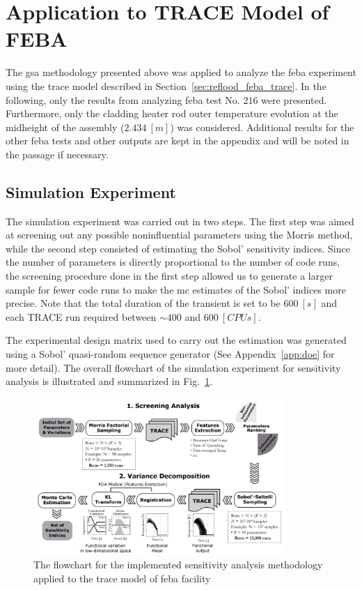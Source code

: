 \section{Application to TRACE Model of FEBA}\label{sec:sa_application_to_feba}

The \gls{gsa} methodology presented above was applied to analyze the \gls{feba} experiment using the \gls{trace} model described in Section~\ref{sec:reflood_feba_trace}.
In the following, only the results from analyzing \gls{feba} test No. $216$ were presented. 
Furthermore, only the cladding heater rod outer temperature evolution at the midheight of the assembly ($2.434 \ [m]$) was considered.
Additional results for the other \gls{feba} tests and other outputs are kept in the appendix and will be noted in the passage if necessary.

\subsection{Simulation Experiment}

The simulation experiment was carried out in two steps.
The first step was aimed at screening out any possible noninfluential parameters using the Morris method, 
while the second step consisted of estimating the Sobol' sensitivity indices.
Since the number of parameters is directly proportional to the number of code runs, 
the screening procedure done in the first step allowed us to generate a larger sample for fewer code runs to make the \gls{mc} estimates of the Sobol' indices more precise.
Note that the total duration of the transient is set to be $600 \ [s]$ and each TRACE run required between $\sim 400$ and $600 \ [CPUs]$.

The experimental design matrix used to carry out the estimation was generated using a Sobol' quasi-random sequence generator \cite{Joe2008} (See Appendix~\ref{app:doe} for more detail).
The overall flowchart of the simulation experiment for sensitivity analysis is illustrated and summarized in Fig.~\ref{fig:sensitivity_flowchart}.

\begin{figure}
	\centering
	\includegraphics[width=0.85\textwidth]{../figures/sensitivityFlowchart/sensitivityFlowchart.png}
	\caption[The flowchart for the implemented sensitivity analysis methodology applied to the TRACE model of FEBA facility]{The flowchart for the implemented sensitivity analysis methodology applied to the \gls{trace} model of \gls{feba} facility}
	\label{fig:sensitivity_flowchart}
\end{figure}

